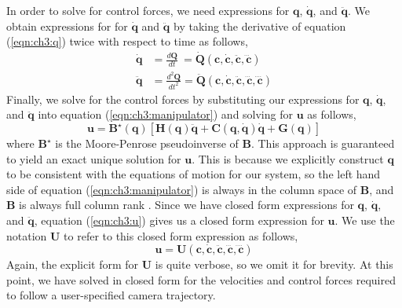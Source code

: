 In order to solve for control forces, we need expressions for $\mathbf{q}$, $\dot{\mathbf{q}}$, and $\ddot{\mathbf{q}}$.
We obtain expressions for for $\dot{\mathbf{q}}$ and $\ddot{\mathbf{q}}$ by taking the derivative of equation (\ref{eqn:ch3:q}) twice with respect to time as follows,
%
\begin{equation}
\begin{aligned}
\dot{\mathbf{q}}  & = \frac{d \mathbf{Q}}{d t}     ~= \mathbf{\dot{\mathbf{Q}}}(\mathbf{c},\dot{\mathbf{c}},\ddot{\mathbf{c}},\dddot{\mathbf{c}} ) \\
\ddot{\mathbf{q}} & = \frac{d^2 \mathbf{Q}}{d t^2}  = \mathbf{\ddot{\mathbf{Q}}}(\mathbf{c},\dot{\mathbf{c}},\ddot{\mathbf{c}},\dddot{\mathbf{c}},\ddddot{\mathbf{c}} )
\end{aligned}
\label{eqn:ch3:qdotN}
\end{equation}
%
Finally, we solve for the control forces by substituting our expressions for $\mathbf{q}$, $\dot{\mathbf{q}}$, and $\ddot{\mathbf{q}}$ into equation (\ref{eqn:ch3:manipulator}) and solving for $\mathbf{u}$ as follows,
%
\begin{equation}
\mathbf{u} = \mathbf{B}^{\star}(\mathbf{q}) \left[\mathbf{H}(\mathbf{q}) \ddot{\mathbf{q}} + \mathbf{C}(\mathbf{q},\dot{\mathbf{q}}) \dot{\mathbf{q}} + \mathbf{G}(\mathbf{q})\right]
\label{eqn:ch3:u}
\end{equation}
%
where $\mathbf{B}^{\star}$ is the Moore-Penrose pseudoinverse of $\mathbf{B}$.
This approach is guaranteed to yield an exact unique solution for $\mathbf{u}$.
This is because we explicitly construct $\mathbf{q}$ to be consistent with the equations of motion for our system, so the left hand side of equation (\ref{eqn:ch3:manipulator}) is always in the column space of $\mathbf{B}$, and $\mathbf{B}$ is always full column rank \cite{joubert:2015}.
Since we have closed form expressions for $\mathbf{q}$, $\dot{\mathbf{q}}$, and $\ddot{\mathbf{q}}$, equation (\ref{eqn:ch3:u}) gives us a closed form expression for $\mathbf{u}$.
We use the notation $\mathbf{U}$ to refer to this closed form expression as follows,
%
\begin{equation}
\mathbf{u} = \mathbf{U}(\mathbf{c},\dot{\mathbf{c}},\ddot{\mathbf{c}},\dddot{\mathbf{c}},\ddddot{\mathbf{c}} )
\label{eqn:ch3:uc}
\end{equation}
%
Again, the explicit form for $\mathbf{U}$ is quite verbose, so we omit it for brevity.
At this point, we have solved in closed form for the velocities and control forces required to follow a user-specified camera trajectory.

